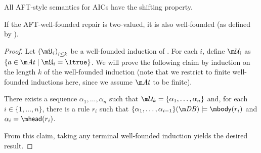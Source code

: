 \begin{corollary}
 All AFT-style semantics for AICs have the shifting property. 
\end{corollary}

\begin{proposition}\label{prop:wf-wf}
 If the AFT-well-founded repair is two-valued,  it is also well-founded (as defined by \citet{tase/Cruz-FilipeEGN13}). 
\end{proposition}
\begin{proof}
Let $\left(\UUU_i\right)_{i\leq k}$ be a well-founded induction of \Ap. 
For each $i$, define $\UU_i$ as $\{a \in \atoms \mid \UUU_i=\ltrue\}$. 
We will prove the following claim by induction on the length $k$ of the well-founded induction (note that we restrict to finite well-founded inductions here, since we assume $\atoms$ to be finite). 

There exists a sequence $\alpha_1,\dots,\alpha_n$ such that $\UU_k=\{\alpha_1,\dots,\alpha_n\}$ and, for each $i\in\{1,\dots,n\}$, there is a rule $r_i$ such that $\{\alpha_1,\dots,\alpha_{i-1}\}(\db) \models \body (r_i)$ and $\alpha_i = \head(r_i)$.

From this claim, taking any terminal well-founded induction yields the desired result. 


\end{proof}
